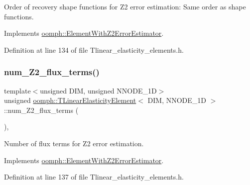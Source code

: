 Order of recovery shape functions for Z2 error estimation\+: Same order as shape functions. 



Implements \hyperlink{classoomph_1_1ElementWithZ2ErrorEstimator_af39480835bd3e0f6b2f4f7a9a4044798}{oomph\+::\+Element\+With\+Z2\+Error\+Estimator}.



Definition at line 134 of file Tlinear\+\_\+elasticity\+\_\+elements.\+h.

\mbox{\label{classoomph_1_1TLinearElasticityElement_a1d2268113e23f9b46ee2ce1c18d836de}} 
\subsubsection{\texorpdfstring{num\+\_\+\+Z2\+\_\+flux\+\_\+terms()}{num\_Z2\_flux\_terms()}}
{\footnotesize\ttfamily template$<$unsigned D\+IM, unsigned N\+N\+O\+D\+E\+\_\+1D$>$ \\
unsigned \hyperlink{classoomph_1_1TLinearElasticityElement}{oomph\+::\+T\+Linear\+Elasticity\+Element}$<$ D\+IM, N\+N\+O\+D\+E\+\_\+1D $>$\+::num\+\_\+\+Z2\+\_\+flux\+\_\+terms (\begin{DoxyParamCaption}{ }\end{DoxyParamCaption})\hspace{0.3cm}{\ttfamily [inline]}, {\ttfamily [virtual]}}



Number of \textquotesingle{}flux\textquotesingle{} terms for Z2 error estimation. 



Implements \hyperlink{classoomph_1_1ElementWithZ2ErrorEstimator_ae82c5728902e13da31be19c390fc28e3}{oomph\+::\+Element\+With\+Z2\+Error\+Estimator}.



Definition at line 137 of file Tlinear\+\_\+elasticity\+\_\+elements.\+h.

\mbox{\label{classoomph_1_1TLinearElasticityElement_a41f8db113faa5d948d8a3ec21f8111b4}} 
